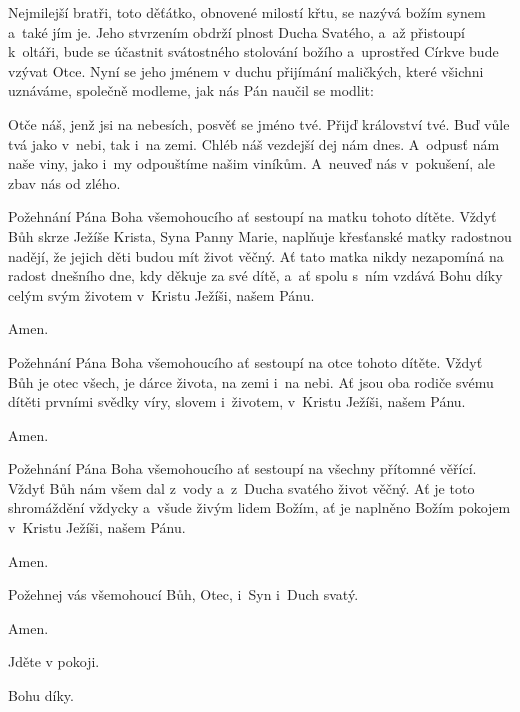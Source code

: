\pars{}


Nejmilejší bratři, toto děťátko, obnovené milostí křtu, se nazývá božím
synem a~také jím je. Jeho stvrzením obdrží plnost Ducha Svatého, a~až
přistoupí k~oltáři, bude se účastnit svátostného stolování božího a~uprostřed
Církve bude vzývat Otce. Nyní se jeho jménem v duchu přijímání
maličkých, které všichni uznáváme, společně modleme, jak nás Pán naučil se
modlit:

Otče náš, jenž jsi na nebesích,
posvěť se jméno tvé.
Přijď království tvé.
Buď vůle tvá jako v~nebi, tak i~na zemi.
Chléb náš vezdejší dej nám dnes.
A~odpusť nám naše viny,
jako i~my odpouštíme našim viníkům.
A~neuveď nás v~pokušení,
ale zbav nás od zlého.

\pars{}


Požehnání Pána Boha všemohoucího ať sestoupí na matku tohoto dítěte.
Vždyť Bůh skrze Ježíše Krista, Syna Panny Marie, naplňuje křesťanské matky radostnou nadějí,
že jejich děti budou mít život věčný. Ať tato matka nikdy nezapomíná na radost dnešního dne,
kdy děkuje za své dítě, a~ať spolu s~ním vzdává Bohu díky celým svým životem v~Kristu Ježíši,
našem Pánu.

 Amen.

 Požehnání Pána Boha všemohoucího ať sestoupí na otce tohoto dítěte.
Vždyť Bůh je otec všech, je dárce života, na zemi i~na nebi.
Ať jsou oba rodiče svému dítěti prvními svědky víry, slovem i~životem, v~Kristu Ježíši, našem Pánu.

 Amen.

 Požehnání Pána Boha všemohoucího ať sestoupí na všechny přítomné věřící.
Vždyť Bůh nám všem dal z~vody a~z~Ducha svatého život věčný. Ať je toto shromáždění vždycky
a~všude živým lidem Božím, ať je naplněno Božím pokojem v~Kristu Ježíši, našem Pánu.

 Amen.

 Požehnej vás všemohoucí Bůh,
Otec, i~Syn \grecross{} i~Duch svatý.

 Amen.

 Jděte v pokoji.

 Bohu díky.
